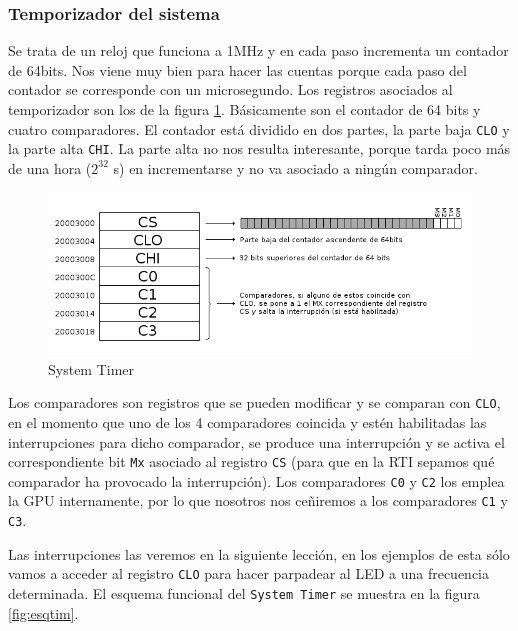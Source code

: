 \subsubsection{Temporizador del sistema}

Se trata de un reloj que funciona a 1MHz y en cada paso incrementa un contador de 64bits. Nos
viene muy bien para hacer las cuentas porque cada paso del contador se corresponde con un
microsegundo. Los registros asociados al temporizador son los de la figura \ref{fig:systim}.
Básicamente son el contador de 64 bits y cuatro comparadores. El contador está dividido en
dos partes, la parte baja {\tt CLO} y la parte alta {\tt CHI}. La parte alta no nos resulta
interesante, porque tarda poco más de una hora ($2^{32}$ \micro s) en incrementarse y no
va asociado a ningún comparador.

\begin{figure}[h]
  \centering
    \includegraphics[width=14cm]{graphs/systemtimer.png}
  \caption{System Timer}
  \label{fig:systim}
\end{figure}

Los comparadores son registros que se pueden modificar y se comparan con {\tt CLO}, en el momento
que uno de los 4 comparadores coincida y estén habilitadas las interrupciones para dicho
comparador, se produce una interrupción y se activa el correspondiente bit {\tt Mx}
asociado al registro {\tt CS} (para que en la RTI sepamos qué comparador ha provocado la interrupción).
Los comparadores {\tt C0} y {\tt C2} los emplea la GPU internamente, por lo que nosotros nos
ceñiremos a los comparadores {\tt C1} y {\tt C3}.

Las interrupciones las veremos en la siguiente lección, en los ejemplos de esta sólo vamos
a acceder al registro {\tt CLO} para hacer parpadear al LED a una frecuencia determinada. El
esquema funcional del {\tt System Timer} se muestra en la figura \ref{fig:esqtim}.

